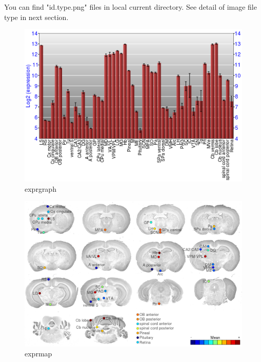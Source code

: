 \documentclass[12pt,fullpage]{article}
\begin{document}
You can find "id.type.png" files in local current directory. See detail of image file type in next section.

\begin{figure}
  \centering
  \includegraphics{exprgraph.png}
  \caption{exprgraph}
\end{figure}

\begin{figure}
  \centering
  \includegraphics{exprmap.png}
  \caption{exprmap}
\end{figure}
\end{document}
